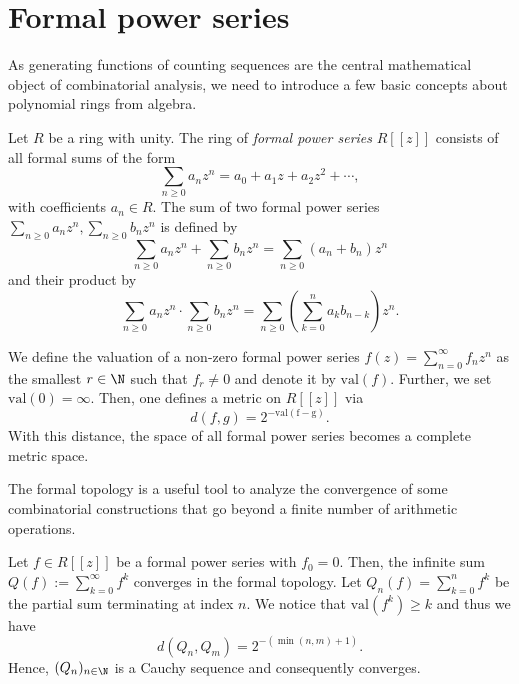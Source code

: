 \section{Formal power series}

As generating functions of counting sequences are the central mathematical object of combinatorial analysis, we need to introduce a few basic concepts about polynomial rings from algebra.

\begin{definition} 
Let $R$ be a ring with unity. The ring of \textit{formal power series} $R[[z]]$ consists of all formal sums of the form 
$$
\sum_{n \geq 0} a_n z^n = a_0 + a_1z + a_2z^2 + \cdots,
$$
with coefficients $a_n \in R$.
The sum of two formal power series $\sum_{n \geq 0} a_n z^n, \sum_{n \geq 0} b_n z^n$ is defined by 
$$
\sum_{n \geq 0} a_n z^n + \sum_{n \geq 0} b_n z^n = \sum_{n \geq 0}(a_n + b_n)z^n
$$
and their product by 
$$
\sum_{n \geq 0}a_n z^n \cdot \sum_{n \geq 0} b_n z^n = \sum_{n \geq 0} \left(\sum_{k=0}^n a_k b_{n-k}\right)z^n.
$$
\end{definition}

\begin{definition}
  We define the valuation of a non-zero formal power series $f(z) = \sum_{n = 0}^\infty f_n z^n$ as the smallest $r \in \N$ such that $f_r \neq 0$ and denote it by $\mathrm{val}(f)$. Further, we set $\mathrm{val}(0) = \infty$. Then, one defines a metric on $R[[z]]$ via
  \begin{equation*}
    d(f,g) = 2^{-\mathrm{val(f-g)}}.
  \end{equation*}
  With this distance, the space of all formal power series becomes a complete metric space.
\end{definition}

The formal topology is a useful tool to analyze the convergence of some combinatorial constructions that go beyond a finite number of arithmetic operations.

\begin{example}\label{ex:formal_topology}
  Let $f \in R[[z]]$ be a formal power series with $f_0 = 0$. 
  Then, the infinite sum $Q(f) := \sum_{k = 0}^\infty f^k$ converges in the formal topology. 
  Let $Q_n(f) = \sum_{k=0}^n f^k$ be the partial sum terminating at index $n$. We notice that $\mathrm{val}(f^k) \geq k$ and thus we have
  $$
    d(Q_n,Q_m) =  2^{-(\min(n,m)+1)}.
  $$
  Hence, $(Q_n)_{n \in \N}$ is a Cauchy sequence and consequently converges.
\end{example}

